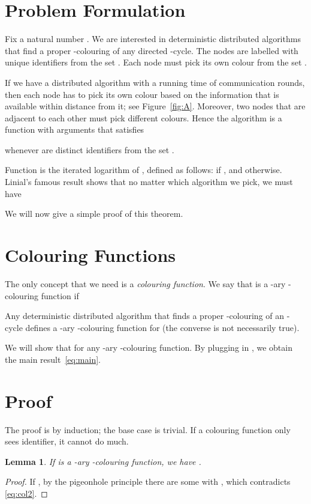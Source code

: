 \documentclass[11pt,a4paper]{article}
\newtheorem{lemma}{Lemma}
\begin{document}
\section{Problem Formulation}

Fix a natural number . We are interested in deterministic distributed algorithms that find a proper -colouring of any directed -cycle. The nodes are labelled with unique identifiers from the set . Each node must pick its own colour from the set .

If we have a distributed algorithm with a running time of  communication rounds, then each node has to pick its own colour based on the information that is available within distance  from it; see Figure~\ref{fig:A}. Moreover, two nodes that are adjacent to each other must pick different colours. Hence the algorithm is a function  with  arguments that satisfies

whenever  are distinct identifiers from the set .

Function  is the iterated logarithm of , defined as follows:
 if , and
 otherwise.
Linial's famous result shows that no matter which algorithm  we pick, we must have

We will now give a simple proof of this theorem.


\section{Colouring Functions}

The only concept that we need is a \emph{colouring function}. We say that  is a -ary -colouring function if

Any deterministic distributed algorithm  that finds a proper -colouring of an -cycle defines a -ary -colouring function for  (the converse is not necessarily true).

We will show that  for any -ary -colouring function. By plugging in , we obtain the main result~\eqref{eq:main}.


\section{Proof}

The proof is by induction; the base case is trivial. If a colouring function only sees  identifier, it cannot do much.

\begin{lemma}\label{lem:base}
    If  is a -ary -colouring function, we have .
\end{lemma}
\begin{proof}
    If , by the pigeonhole principle there are some  with , which contradicts \eqref{eq:col2}.
\end{proof}
\end{document}
